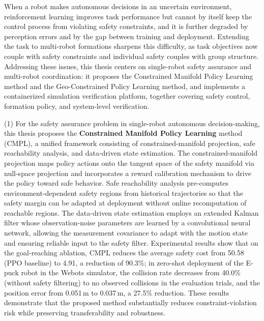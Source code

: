 \begin{EnglishAbstract}
    When a robot makes autonomous decisions in an uncertain environment, reinforcement learning improves task performance but cannot by itself keep the control process from violating safety constraints, and it is further degraded by perception errors and by the gap between training and deployment. Extending the task to multi-robot formations sharpens this difficulty, as task objectives now couple with safety constraints and individual safety couples with group structure. Addressing these issues, this thesis centers on single-robot safety assurance and multi-robot coordination: it proposes the Constrained Manifold Policy Learning method and the Geo-Constrained Policy Learning method, and implements a containerized simulation verification platform, together covering safety control, formation policy, and system-level verification.

    (1) For the safety assurance problem in single-robot autonomous decision-making, this thesis proposes the \textbf{Constrained Manifold Policy Learning} method (CMPL), a unified framework consisting of constrained-manifold projection, safe reachability analysis, and data-driven state estimation. The constrained-manifold projection maps policy actions onto the tangent space of the safety manifold via null-space projection and incorporates a reward calibration mechanism to drive the policy toward safe behavior. Safe reachability analysis pre-computes environment-dependent safety regions from historical trajectories so that the safety margin can be adapted at deployment without online recomputation of reachable regions. The data-driven state estimation employs an extended Kalman filter whose observation-noise parameters are learned by a convolutional neural network, allowing the measurement covariance to adapt with the motion state and ensuring reliable input to the safety filter. Experimental results show that on the goal-reaching ablation, CMPL reduces the average safety cost from 50.58 (PPO baseline) to 4.91, a reduction of 90.3\%; in zero-shot deployment of the E-puck robot in the Webots simulator, the collision rate decreases from 40.0\% (without safety filtering) to no observed collisions in the evaluation trials, and the position error from 0.051\,m to 0.037\,m, a 27.5\% reduction. These results demonstrate that the proposed method substantially reduces constraint-violation risk while preserving transferability and robustness.


\end{EnglishAbstract}
